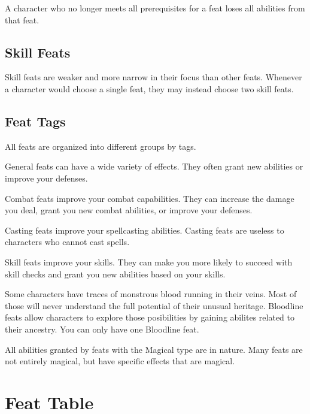         A character who no longer meets all prerequisites for a feat loses all abilities from that feat.

    \subsection{Skill Feats}
        Skill feats are weaker and more narrow in their focus than other feats.
        Whenever a character would choose a single feat, they may instead choose two skill feats.

    \subsection{Feat Tags}
        All feats are organized into different groups by tags.

         General feats can have a wide variety of effects.
        They often grant new abilities or improve your defenses.

         Combat feats improve your combat capabilities.
        They can increase the damage you deal, grant you new combat abilities, or improve your defenses.

         Casting feats improve your spellcasting abilities.
        Casting feats are useless to characters who cannot cast spells.

         Skill feats improve your skills.
        They can make you more likely to succeed with skill checks and grant you new abilities based on your skills.

         Some characters have traces of monstrous blood running in their veins.
        Most of those will never understand the full potential of their unusual heritage.
        Bloodline feats allow characters to explore those posibilities by gaining abilites related to their ancestry.
        You can only have one Bloodline feat.

        All abilities granted by feats with the Magical type are  in nature.
        Many feats are not entirely magical, but have specific effects that are magical.

\section{Feat Table}

